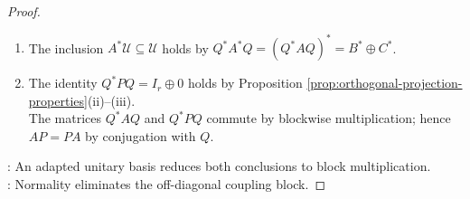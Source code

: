 \begin{theorem}
\begin{proof}
\begin{enumerate}[label=(\roman*)]
\setlength{\itemsep}{0pt}
\item The inclusion $A^*\mathcal{U}\subseteq\mathcal{U}$ holds by $Q^*A^*Q=(Q^*AQ)^*=B^*\oplus C^*$.
\item The identity $Q^*PQ=I_r\oplus0$ holds by Proposition \ref{prop:orthogonal-projection-properties}(ii)--(iii).\\
The matrices $Q^*AQ$ and $Q^*PQ$ commute by blockwise multiplication; hence $AP=PA$ by conjugation with $Q$.
\end{enumerate}
: An adapted unitary basis reduces both conclusions to block multiplication.\\
: Normality eliminates the off-diagonal coupling block.
\end{proof}
\end{theorem}

